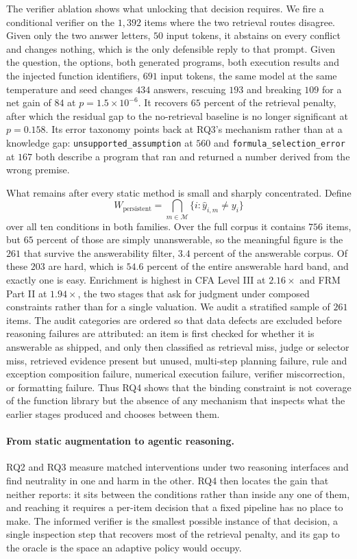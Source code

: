 The verifier ablation shows what unlocking that decision requires. We fire a conditional verifier
on the $1{,}392$ items where the two retrieval routes disagree. Given only the two answer
letters, $50$ input tokens, it abstains on every conflict and changes nothing, which is the only
defensible reply to that prompt. Given the question, the options, both generated programs, both
execution results and the injected function identifiers, $691$ input tokens, the same model at
the same temperature and seed changes $434$ answers, rescuing $193$ and breaking $109$ for a net
gain of $84$ at $p=1.5\times10^{-6}$. It recovers $65$ percent of the retrieval penalty, after
which the residual gap to the no-retrieval baseline is no longer significant at $p=0.158$. Its
error taxonomy points back at RQ3's mechanism rather than at a knowledge gap:
\texttt{unsupported\_assumption} at $560$ and \texttt{formula\_selection\_error} at $167$ both
describe a program that ran and returned a number derived from the wrong premise.

What remains after every static method is small and sharply concentrated. Define
\begin{equation}
W_{\mathrm{persistent}}=\bigcap_{m\in\mathcal{M}}\{i:\hat y_{i,m}\neq y_i\}
\end{equation}
over all ten conditions in both families. Over the full corpus it contains $756$ items, but $65$ percent
of those are simply unanswerable, so the meaningful figure is the $261$ that survive the
answerability filter, $3.4$ percent of the answerable corpus. Of these $203$ are hard, which is
$54.6$ percent of the entire answerable hard band, and exactly one is easy. Enrichment is highest
in CFA Level III at $2.16\times$ and FRM Part II at $1.94\times$, the two stages that ask for
judgment under composed constraints rather than for a single valuation. We audit a stratified
sample of $261$ items. The audit categories are ordered so that data defects are excluded before
reasoning failures are attributed: an item is first checked for
whether it is answerable as shipped, and only then classified as retrieval miss, judge or
selector miss, retrieved evidence present but unused, multi-step planning failure, rule and
exception composition failure, numerical execution failure, verifier miscorrection, or formatting
failure. Thus RQ4 shows that the binding constraint is not coverage of the function library but
the absence of any mechanism that inspects what the earlier stages produced and chooses between
them.

\paragraph{From static augmentation to agentic reasoning.}
RQ2 and RQ3 measure matched interventions under two reasoning interfaces and find neutrality in
one and harm in the other. RQ4 then locates the gain that neither reports: it sits between the
conditions rather than inside any one of them, and reaching it requires a per-item decision that a
fixed pipeline has no place to make. The informed verifier is the smallest possible instance of
that decision, a single inspection step that recovers most of the retrieval penalty, and its
gap to the oracle is the space an adaptive policy would occupy.

